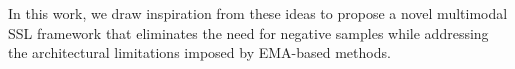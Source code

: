 \documentclass{article}
\newcommand{\alain}[1]{\textcolor{magenta}{#1}}
\begin{document}
In this work, we draw inspiration from these ideas to propose a novel multimodal SSL framework that eliminates the need for negative samples while addressing the architectural limitations imposed by EMA-based methods.



\end{document}

